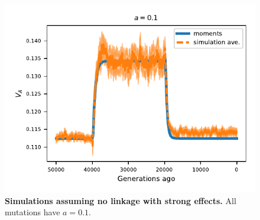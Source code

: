 \documentclass[]{article}
\begin{document}
\begin{figure}[ht!]
    \centering
    \includegraphics{../figures/one_pop.a_0.1.pdf}
    \caption{
        \textbf{Simulations assuming no linkage with strong effects.}
        All mutations have $a=0.1$.
    }
    \label{fig:one-popC}
\end{figure}
\end{document}
